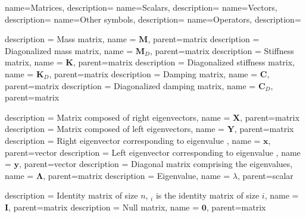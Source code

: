 
{
	name={{\Large Matrices\bigskip}}, 
	description={\nopostdesc}
}
{
	name={{\Large Scalars\bigskip}}, 
	description={\nopostdesc}
}
{
	name={{\Large Vectors\bigskip}}, 
	description={\nopostdesc}
}
{
	name={{\Large Other symbols\bigskip}}, 
	description={\nopostdesc}
}
{
	name={{\Large Operators\bigskip}}, 
	description={\nopostdesc}
}


{
	description = {Mass matrix}, 
	name = {\ensuremath{\mathbf{M}}},
	parent=matrix
}
{
	description = {Diagonalized mass matrix}, 
	name = {\ensuremath{\mathbf{M}_D}},
	parent=matrix
}
{
	description = {Stiffness matrix}, 
	name = {\ensuremath{\mathbf{K}}},
	parent=matrix
}
{
	description = {Diagonalized stiffness matrix}, 
	name = {\ensuremath{\mathbf{K}_D}},
	parent=matrix
}
{
	description = {Damping matrix}, 
	name = {\ensuremath{\mathbf{C}}},
	parent=matrix
}
{
	description = {Diagonalized damping matrix}, 
	name = {\ensuremath{\mathbf{C}_D}},
	parent=matrix
}


{
	description = {Matrix composed of right eigenvectors}, 
	name = {\ensuremath{\mathbf{X}}},
	parent=matrix
}
{
	description = {Matrix composed of left eigenvectors}, 
	name = {\ensuremath{\mathbf{Y}}},
	parent=matrix
}
{
	description = {Right eigenvector corresponding to eigenvalue }, 
	name = {\ensuremath{\mathbf{x}}},
	parent=vector
}
{
	description = {Left eigenvector corresponding to eigenvalue }, 
	name = {\ensuremath{\mathbf{y}}},
	parent=vector
}
{
	description = {Diagonal matrix comprising the eigenvalues}, 
	name = {\ensuremath{\mathbf{\Lambda}}},
	parent=matrix
}
{
	description = {Eigenvalue}, 
	name = {\ensuremath{\lambda}},
	parent=scalar
}


{
	description = {Identity matrix of size  \ensuremath{n}, \ensuremath{_i} is the identity matrix of size \ensuremath{i}}, 
	name = {\ensuremath{\mathbf{I}}},
	parent=matrix
}
{
	description = {Null matrix}, 
	name = {\ensuremath{\mathbf{0}}},
	parent=matrix
}



